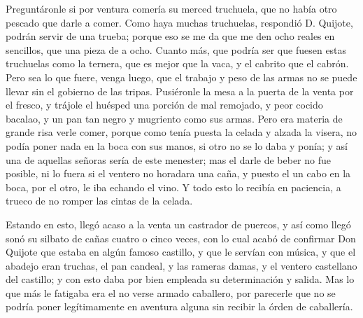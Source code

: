     Preguntáronle si por ventura comería su merced truchuela, que no
    había otro pescado que darle a comer. Como haya muchas truchuelas,
    respondió D. Quijote, podrán servir de una trueba; porque eso se
    me da que me den ocho reales en sencillos, que una pieza de a
    ocho. Cuanto más, que podría ser que fuesen estas truchuelas como
    la ternera, que es mejor que la vaca, y el cabrito que el cabrón.
    Pero sea lo que fuere, venga luego, que el trabajo y peso de las
    armas no se puede llevar sin el gobierno de las tripas. Pusiéronle
    la mesa a la puerta de la venta por el fresco, y trájole el
    huésped una porción de mal remojado, y peor cocido bacalao, y un
    pan tan negro y mugriento como sus armas. Pero era materia de
    grande risa verle comer, porque como tenía puesta la celada y
    alzada la visera, no podía poner nada en la boca con sus manos, si
    otro no se lo daba y ponía; y así una de aquellas señoras sería de
    este menester; mas el darle de beber no fue posible, ni lo fuera
    si el ventero no horadara una caña, y puesto el un cabo en la
    boca, por el otro, le iba echando el vino. Y todo esto lo recibía
    en paciencia, a trueco de no romper las cintas de la celada.
    
    Estando en esto, llegó acaso a la venta un castrador de puercos, y
    así como llegó sonó su silbato de cañas cuatro o cinco veces, con
    lo cual acabó de confirmar Don Quijote que estaba en algún famoso
    castillo, y que le servían con música, y que el abadejo eran
    truchas, el pan candeal, y las rameras damas, y el ventero
    castellano del castillo; y con esto daba por bien empleada su
    determinación y salida. Mas lo que más le fatigaba era el no  verse
    armado caballero, por parecerle que no se podría poner
    legítimamente en aventura alguna sin recibir la órden de
    caballería.
